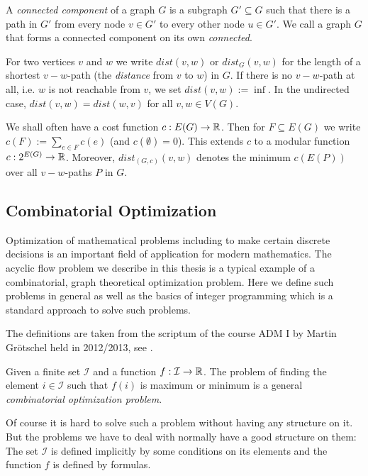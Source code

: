 \begin{definition}
 A \textit{ connected component } of a graph $G$ is a subgraph $G'\subseteq G$ such that there is a path in $G'$ from 
 every node $v\in G'$ to every other node $u\in G'$. We call a graph $G$ that forms a connected component on its own 
 \textit{connected}. 
\end{definition}


\begin{definition}
For two vertices $v$ and $w$ we write $dist(v, w)$ or $dist_G (v, w)$ for the length of
a shortest $v-w$-path (the \textit{distance} from $v$ to $w$) in $G$. If there is no $v-w$-path at all,
i.e. $w$ is not reachable from $v$, we set $dist(v, w) := \inf$. In the undirected case,
$dist(v, w) = dist(w, v)$ for all $v, w \in V(G)$.
\end{definition}

\begin{definition}

We shall often have a cost function $c : E(G) \to \mathbb{R}$. Then for $F \subseteq E(G)$ we
write $c(F) := \sum_{e\in F} c(e)$ (and $c(\emptyset) = 0$). This extends $c$ to a modular function
$c : 2^{E(G)}\to \mathbb{R}$. Moreover, $dist_{(G,c)}(v, w)$ denotes the minimum $c(E(P))$ over all
$v-w$-paths $P$ in $G$.
 
\end{definition}

\subsection{Combinatorial Optimization}
Optimization of mathematical problems including to make certain discrete decisions is an important field of application 
for modern mathematics. The acyclic flow problem we describe in this thesis is a typical example of a combinatorial, 
graph theoretical optimization problem. Here we define such problems in general as well as the basics of integer 
programming which is a standard approach to solve such problems. 

The definitions are taken from the scriptum of the course ADM I by Martin Gr\"otschel held in 2012/2013, see 
\cite{groetschelSkript}. %

\begin{definition}
 Given a finite set $\mathcal{I}$ and a function $f:\mathcal{I}\to\mathbb{R}$. The problem of finding the element 
$i\in\mathcal{I}$ such that $f(i)$ is maximum or minimum is a general \textit{combinatorial optimization problem}.
\end{definition}
Of course it is hard to solve such a problem without having any structure on it. But the problems we have to deal with 
normally have  a good structure on them: The set $\mathcal{I}$ is defined implicitly by some conditions on its elements 
and the function $f$ is defined by formulas.

